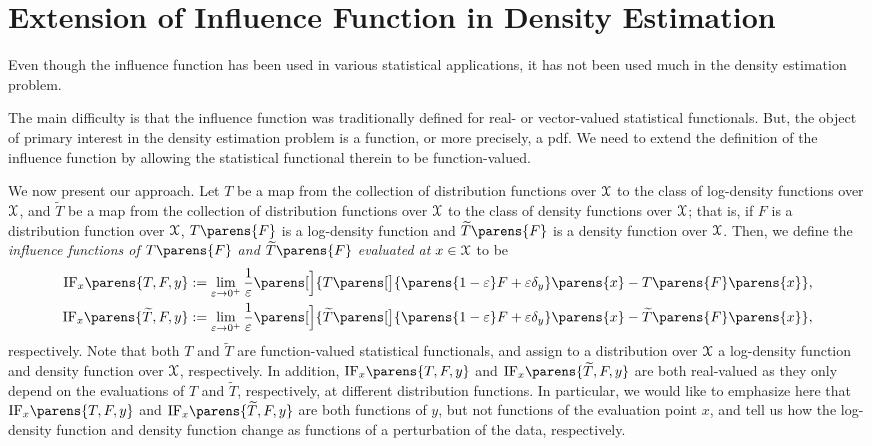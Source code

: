 \section{Extension of Influence Function in Density Estimation}\label{section-influence-function-extension}

Even though the influence function has been used in various statistical applications, it has not been used much in the density estimation problem. 

The main difficulty is that the influence function was traditionally defined for real- or vector-valued statistical functionals. But, the object of primary interest in the density estimation problem is a function, or more precisely, a pdf. We need to extend the definition of the influence function by allowing the statistical functional therein to be function-valued. 

We now present our approach. Let $T$ be a map from the collection of distribution functions over $\mathcal{X}$ to the class of log-density functions over $\mathcal{X}$, and $\widetilde{T}$ be a map from the collection of distribution functions over $\mathcal{X}$ to the class of density functions over $\mathcal{X}$; that is, if $F$ is a distribution function over $\mathcal{X}$, $T \parens{F}$ is a log-density function and $\widetilde{T} \parens{F}$ is a density function over $\mathcal{X}$. Then, we define the \textit{influence functions of $T \parens{F}$ and $\widetilde{T} \parens{F}$ evaluated at $x \in \mathcal{X}$} to be 
\begin{align}
	\mathrm{IF}_x \parens{T, F, y} := \lim_{\varepsilon \to 0^+} \frac{1}{\varepsilon} \parens[\Big]{T \parens[\big]{\parens{1 - \varepsilon} F + \varepsilon \delta_y} \parens{x} - T \parens{F} \parens{x}}, \label{eq-inf-fun-def-log-density} \\ 
	\mathrm{IF}_x \parens{\widetilde{T}, F, y} := \lim_{\varepsilon \to 0^+} \frac{1}{\varepsilon} \parens[\Big]{\widetilde{T} \parens[\big]{\parens{1 - \varepsilon} F + \varepsilon \delta_y} \parens{x} - \widetilde{T} \parens{F} \parens{x}}, \label{eq-inf-fun-def-density}
\end{align}
respectively. Note that both $T$ and $\widetilde{T}$ are function-valued statistical functionals, and assign to a distribution over $\mathcal{X}$ a log-density function and density function over $\mathcal{X}$, respectively. In addition, $\mathrm{IF}_x \parens{T, F, y}$ and $\mathrm{IF}_x \parens{\widetilde{T}, F, y}$ are both real-valued as they only depend on the evaluations of $T$ and $\widetilde{T}$, respectively, at different distribution functions. In particular, we would like to emphasize here that $\mathrm{IF}_x \parens{T, F, y}$ and $\mathrm{IF}_x \parens{\widetilde{T}, F, y}$ are both functions of $y$, but not functions of the evaluation point $x$, and tell us how the log-density function and density function change as functions of a perturbation of the data, respectively. 


